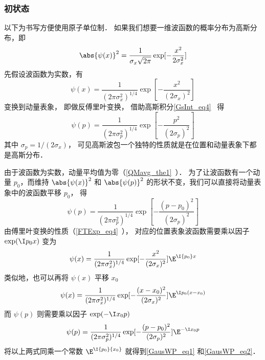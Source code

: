 \subsubsection{初状态}

以下为书写方便使用原子单位制． 如果我们想要一维波函数的概率分布为高斯分布，即
\begin{equation}
\abs{\psi (x)}^2 = \frac{1}{\sigma_x \sqrt{2\pi}} \exp[-\frac{x^2}{2\sigma_x^2}]
\end{equation}
先假设波函数为实数，有
\begin{equation}
\psi (x) = \frac{1}{(2\pi\sigma_x^2)^{1/4}} \exp[-\frac{x^2}{(2\sigma_x)^2}]
\end{equation}
变换到动量表象， 即做反傅里叶变换， 借助高斯积分\autoref{GsInt_eq4}~ 得
\begin{equation}
\psi(p) = \frac{1}{(2\pi\sigma_p^2)^{1/4}} \exp[-\frac{p^2}{(2\sigma_p)^2}]
\end{equation}
其中 $\sigma_p = 1/(2\sigma_x)$， 可见高斯波包一个独特的性质就是在位置和动量表象下都是高斯分布．

由于波函数为实数，动量平均值为零（\autoref{QMavg_the1}~）． 为了让波函数有一个动量 $p_0$，而维持 $\abs{\psi(x)}^2$ 和 $\abs{\psi(p)}^2$ %
的形状不变，我们可以直接将动量表象中的波函数平移 $p_0$， 得
\begin{equation}
\psi (p) = \frac{1}{(2\pi\sigma_p^2)^{1/4}} \exp[-\frac{(p - p_0)^2}{(2\sigma_p)^2}]
\end{equation}
由傅里叶变换的性质（\autoref{FTExp_eq4}~）， 对应的位置表象波函数需要乘以因子 $\exp(\I p_0 x)$ 变为
\begin{equation}
\psi(x) = \frac{1}{(2\pi\sigma_x^2)^{1/4}} \exp[-\frac{x^2}{(2\sigma_x)^2}] {\E^{\I {p_0}x}}
\end{equation}
类似地，也可以再将 $\psi(x)$ 平移 $x_0$ 
\begin{equation}
\psi (x) = \frac{1}{(2\pi\sigma_x^2)^{1/4}} \exp[-\frac{(x-x_0)^2}{(2\sigma_x)^2}] \E^{\I p_0 (x-x_0)}
\end{equation}
而 $\psi(p)$ 则需要乘以因子 $\exp (-\I x_0 p)$
\begin{equation}\label{GausWP_eq3}
\psi(p) = \frac{1}{(2\pi\sigma_p^2)^{1/4}} \exp[-\frac{(p - p_0)^2}{(2\sigma_p)^2}] \E^{-\I x_0 p}
\end{equation}
将以上两式同乘一个常数%
 ${\E^{\I{p_0}{x_0}}}$ 就得到\autoref{GausWP_eq1} 和\autoref{GausWP_eq2}．

